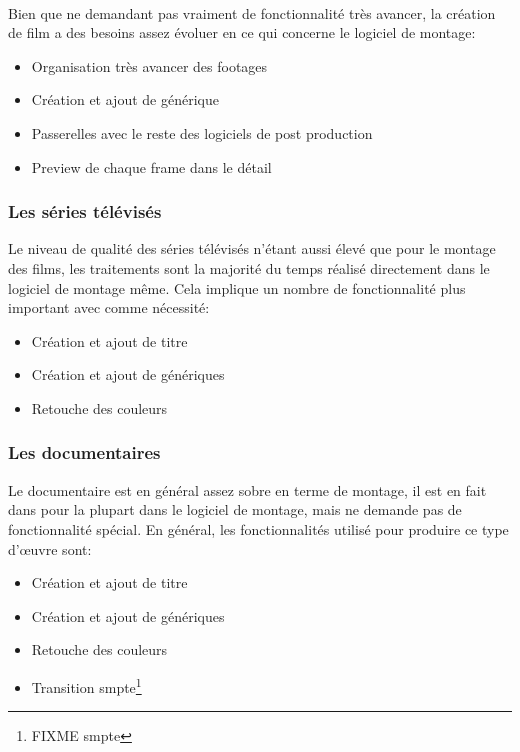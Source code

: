       \paragraph{}
        Bien que ne demandant pas vraiment de fonctionnalité très avancer, la création
        de film a des besoins assez évoluer en ce qui concerne le logiciel de montage:
        \begin{itemize}
          \item{Organisation très avancer des footages}
          \item{Création et ajout de générique}
          \item{Passerelles avec le reste des logiciels de post production}
          \item{Preview de chaque frame dans le détail}
        \end{itemize}


    \subsubsection {Les séries télévisés}
      Le niveau de qualité des séries télévisés n'étant aussi élevé que pour
      le montage des films, les traitements sont la majorité du temps réalisé
      directement dans le logiciel de montage même. Cela implique un nombre de
      fonctionnalité plus important avec comme nécessité:
      \begin{itemize}
        \item{Création et ajout de titre}
        \item{Création et ajout de génériques}
        \item{Retouche des couleurs}
      \end{itemize}

    \subsubsection {Les documentaires}
      Le documentaire est en général assez sobre en terme de montage, il est en
      fait dans pour la plupart dans le logiciel de montage, mais ne demande pas
      de fonctionnalité spécial. En général, les fonctionnalités utilisé
      pour produire ce type d'œuvre sont:
      \begin{itemize}
        \item{Création et ajout de titre}
        \item{Création et ajout de génériques}
        \item{Retouche des couleurs}
        \item{Transition smpte\footnote{FIXME smpte}}
      \end{itemize}

